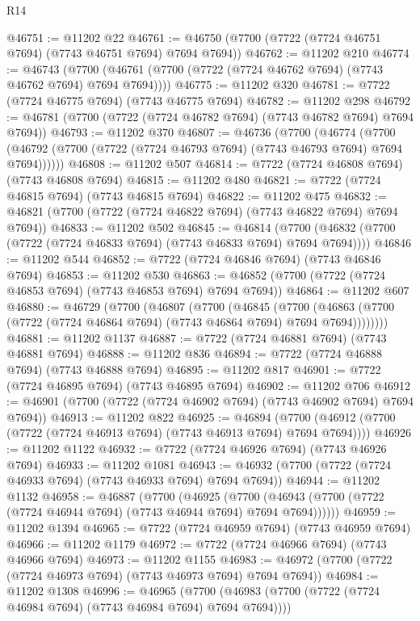 \begin{lexlean}{R14}
\begin{coremodule}
@46751 := @11202 @22
@46761 := @46750 (@7700 (@7722 (@7724 @46751 @7694) (@7743 @46751 @7694) @7694 @7694))
@46762 := @11202 @210
@46774 := @46743
    (@7700 (@46761 (@7700 (@7722 (@7724 @46762 @7694) (@7743 @46762 @7694) @7694 @7694))))
@46775 := @11202 @320
@46781 := @7722 (@7724 @46775 @7694) (@7743 @46775 @7694)
@46782 := @11202 @298
@46792 := @46781 (@7700 (@7722 (@7724 @46782 @7694) (@7743 @46782 @7694) @7694 @7694))
@46793 := @11202 @370
@46807 := @46736
    (@7700
      (@46774
        (@7700 (@46792 (@7700 (@7722 (@7724 @46793 @7694) (@7743 @46793 @7694) @7694 @7694))))))
@46808 := @11202 @507
@46814 := @7722 (@7724 @46808 @7694) (@7743 @46808 @7694)
@46815 := @11202 @480
@46821 := @7722 (@7724 @46815 @7694) (@7743 @46815 @7694)
@46822 := @11202 @475
@46832 := @46821 (@7700 (@7722 (@7724 @46822 @7694) (@7743 @46822 @7694) @7694 @7694))
@46833 := @11202 @502
@46845 := @46814
    (@7700 (@46832 (@7700 (@7722 (@7724 @46833 @7694) (@7743 @46833 @7694) @7694 @7694))))
@46846 := @11202 @544
@46852 := @7722 (@7724 @46846 @7694) (@7743 @46846 @7694)
@46853 := @11202 @530
@46863 := @46852 (@7700 (@7722 (@7724 @46853 @7694) (@7743 @46853 @7694) @7694 @7694))
@46864 := @11202 @607
@46880 := @46729
    (@7700
      (@46807
        (@7700
          (@46845
            (@7700
              (@46863 (@7700 (@7722 (@7724 @46864 @7694) (@7743 @46864 @7694) @7694 @7694))))))))
@46881 := @11202 @1137
@46887 := @7722 (@7724 @46881 @7694) (@7743 @46881 @7694)
@46888 := @11202 @836
@46894 := @7722 (@7724 @46888 @7694) (@7743 @46888 @7694)
@46895 := @11202 @817
@46901 := @7722 (@7724 @46895 @7694) (@7743 @46895 @7694)
@46902 := @11202 @706
@46912 := @46901 (@7700 (@7722 (@7724 @46902 @7694) (@7743 @46902 @7694) @7694 @7694))
@46913 := @11202 @822
@46925 := @46894
    (@7700 (@46912 (@7700 (@7722 (@7724 @46913 @7694) (@7743 @46913 @7694) @7694 @7694))))
@46926 := @11202 @1122
@46932 := @7722 (@7724 @46926 @7694) (@7743 @46926 @7694)
@46933 := @11202 @1081
@46943 := @46932 (@7700 (@7722 (@7724 @46933 @7694) (@7743 @46933 @7694) @7694 @7694))
@46944 := @11202 @1132
@46958 := @46887
    (@7700
      (@46925
        (@7700 (@46943 (@7700 (@7722 (@7724 @46944 @7694) (@7743 @46944 @7694) @7694 @7694))))))
@46959 := @11202 @1394
@46965 := @7722 (@7724 @46959 @7694) (@7743 @46959 @7694)
@46966 := @11202 @1179
@46972 := @7722 (@7724 @46966 @7694) (@7743 @46966 @7694)
@46973 := @11202 @1155
@46983 := @46972 (@7700 (@7722 (@7724 @46973 @7694) (@7743 @46973 @7694) @7694 @7694))
@46984 := @11202 @1308
@46996 := @46965
    (@7700 (@46983 (@7700 (@7722 (@7724 @46984 @7694) (@7743 @46984 @7694) @7694 @7694))))

\end{coremodule}
\end{lexlean}
